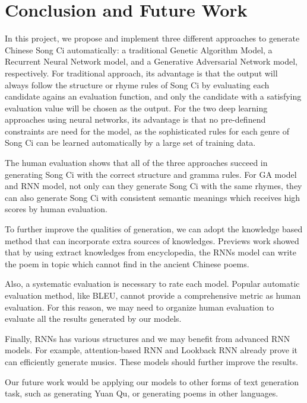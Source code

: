 
\section{Conclusion and Future Work} 

In this project, we propose and implement three different approaches to generate Chinese Song Ci automatically: a traditional Genetic Algorithm Model, a Recurrent Neural Network model, and a Generative Adversarial Network model, respectively.
%
For traditional approach, its advantage is that the output will always follow the structure or rhyme rules of Song Ci by evaluating each candidate agains an evaluation function,  and only the candidate with a satisfying evaluation value will be chosen as the output.
%
For the two deep learning approaches using neural networks, its advantage is that no pre-definend constraints are need for the model, as  the sophisticated rules for each genre of Song Ci can be learned automatically by a large set of training data.

The human evaluation shows that all of the three approaches succeed in generating Song Ci with the correct structure and gramma rules. For GA model and RNN model, not only can they generate Song Ci with the same rhymes, they can also generate Song Ci with consistent semantic meanings which receives high scores by human evaluation. 

To further improve the qualities of generation, we can adopt the knowledge based method that can incorporate extra sources of knowledges. Previews work \cite{wang2016baidu} showed that by using extract knowledges from encyclopedia, the RNNs model can write the poem in topic which cannot find in the ancient Chinese poems. 

Also, a systematic evaluation is necessary to rate each model. Popular automatic evaluation method, like BLEU, cannot provide a comprehensive metric as human evaluation\cite{iu2016evaluate}. For this reason, we may need to organize human evaluation to evaluate all the results generated by our models.

Finally, RNNs has various structures and we may benefit from advanced RNN models. For example, attention-based RNN and Lookback RNN \cite{lookbackRNN} already prove it can efficiently generate musics. These models should further improve the results.


Our future work would be applying our models to other forms of text generation task, such as generating Yuan Qu, or generating poems in other languages.

